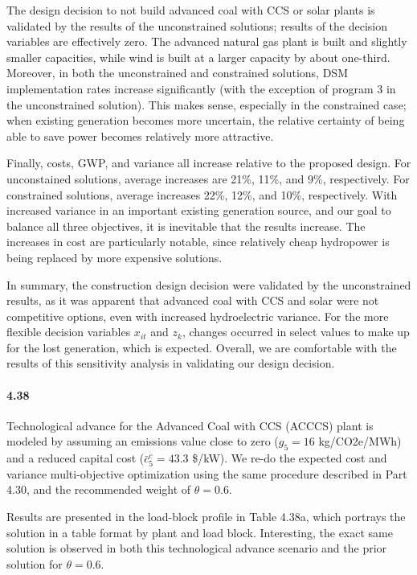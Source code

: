 \documentclass{article}
\begin{document}
	The design decision to not build advanced coal with CCS or solar plants is validated by the results of the unconstrained solutions; results of the decision variables are effectively zero. The advanced natural gas plant is built and slightly smaller capacities, while wind is built at a larger capacity by about one-third. Moreover, in both the unconstrained and constrained solutions, DSM implementation rates increase significantly (with the exception of program 3 in the unconstrained solution). This makes sense, especially in the constrained case; when existing generation becomes more uncertain, the relative certainty of being able to save power becomes relatively more attractive. 
	
	Finally, costs, GWP, and variance all increase relative to the proposed design. For unconstained solutions, average increases are 21\%, 11\%, and 9\%, respectively. For constrained solutions, average increases 22\%, 12\%, and 10\%, respectively. With increased variance in an important existing generation source, and our goal to balance all three objectives, it is inevitable that the results increase. The increases in cost are particularly notable, since relatively cheap hydropower is being replaced by more expensive solutions.
	
	In summary, the construction design decision were validated by the unconstrained results, as it was apparent that advanced coal with CCS and solar were not competitive options, even with increased hydroelectric variance. For the more flexible decision variables $x_{it}$ and $z_k$, changes occurred in select values to make up for the lost generation, which is expected. Overall, we are comfortable with the results of this sensitivity analysis in validating our design decision.


\paragraph{4.38}
	Technological advance for the Advanced Coal with CCS (ACCCS) plant is modeled by assuming an emissions value close to zero ($g_5 = 16$ kg/CO2e/MWh) and a reduced capital cost ($\bar{c}_5^c = 43.3$ \$/kW). We re-do the expected cost and variance multi-objective optimization using the same procedure described in Part 4.30, and the recommended weight of $\theta = 0.6$.
	
	Results are presented in the load-block profile in Table 4.38a, which portrays the solution in a table format by plant and load block. Interesting, the exact same solution is observed in both this technological advance scenario and the prior solution for $\theta = 0.6$. 
	
\end{document}
